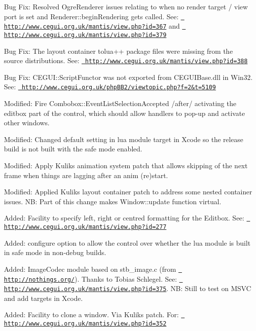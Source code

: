 \begin{DoxyItemize}
\item Bug Fix\+: Resolved Ogre\+Renderer issues relating to when no render target / view port is set and Renderer\+::begin\+Rendering gets called. See\+: \href{http://www.cegui.org.uk/mantis/view.php?id=367}{\texttt{ http\+://www.\+cegui.\+org.\+uk/mantis/view.\+php?id=367}} and \href{http://www.cegui.org.uk/mantis/view.php?id=379}{\texttt{ http\+://www.\+cegui.\+org.\+uk/mantis/view.\+php?id=379}}
\item Bug Fix\+: The layout container tolua++ package files were missing from the source distributions. See\+: \href{http://www.cegui.org.uk/mantis/view.php?id=388}{\texttt{ http\+://www.\+cegui.\+org.\+uk/mantis/view.\+php?id=388}}
\item Bug Fix\+: C\+E\+G\+U\+I\+::\+Script\+Functor was not exported from C\+E\+G\+U\+I\+Base.\+dll in Win32. See\+: \href{http://www.cegui.org.uk/phpBB2/viewtopic.php?f=2&t=5109}{\texttt{ http\+://www.\+cegui.\+org.\+uk/php\+B\+B2/viewtopic.\+php?f=2\&t=5109}}
\item Modified\+: Fire Combobox\+::\+Event\+List\+Selection\+Accepted /after/ activating the editbox part of the control, which should allow handlers to pop-\/up and activate other windows.
\item Modified\+: Changed default setting in lua module target in Xcode so the release build is not built with the \textquotesingle{}safe\textquotesingle{} mode enabled.
\item Modified\+: Apply Kulik\textquotesingle{}s animation system patch that allows skipping of the next frame when things are lagging after an anim (re)start.
\item Modified\+: Applied Kulik\textquotesingle{}s layout container patch to address some nested container issues. NB\+: Part of this change makes Window\+::update function virtual.
\item Added\+: Facility to specify left, right or centred formatting for the Editbox. See\+: \href{http://www.cegui.org.uk/mantis/view.php?id=277}{\texttt{ http\+://www.\+cegui.\+org.\+uk/mantis/view.\+php?id=277}}
\item Added\+: configure option to allow the control over whether the lua module is built in \textquotesingle{}safe\textquotesingle{} mode in non-\/debug builds.
\item Added\+: Image\+Codec module based on stb\+\_\+image.\+c (from \href{http://nothings.org/}{\texttt{ http\+://nothings.\+org/}}). Thanks to Tobias Schlegel. See\+: \href{http://www.cegui.org.uk/mantis/view.php?id=375}{\texttt{ http\+://www.\+cegui.\+org.\+uk/mantis/view.\+php?id=375}}. NB\+: Still to test on M\+S\+VC and add targets in Xcode.
\item Added\+: Facility to clone a window. Via Kulik\textquotesingle{}s patch. For\+: \href{http://www.cegui.org.uk/mantis/view.php?id=352}{\texttt{ http\+://www.\+cegui.\+org.\+uk/mantis/view.\+php?id=352}}
\end{DoxyItemize}

